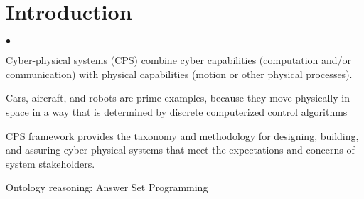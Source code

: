 \section{Introduction}

\begin{list}{$\bullet$}{\itemsep=0pt \parsep=1pt \topsep=1pt \leftmargin=12pt} 
\item Cyber-physical systems (CPS) combine cyber capabilities (computation and/or communication) with physical capabilities (motion or other physical processes).
 
\item Cars, aircraft,
and robots are prime examples, because they move physically in space in a way that is determined by discrete computerized control algorithms

\item CPS framework provides the taxonomy and methodology for designing, building, and assuring cyber-physical systems that meet the expectations and concerns of system stakeholders.

\item Ontology reasoning: Answer Set Programming
\end{list}

